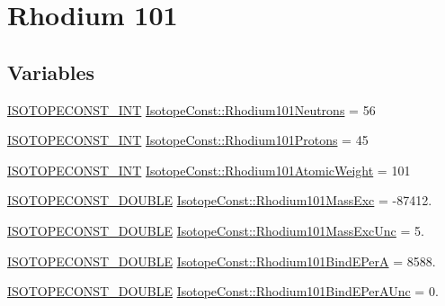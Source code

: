 \hypertarget{group___isotope_const-_rhodium-_rh101}{}\section{Rhodium 101}
\label{group___isotope_const-_rhodium-_rh101}
\subsection*{Variables}
\begin{DoxyCompactItemize}
\item 
\mbox{\hyperlink{group___isotope_const-_macros_ga5f18360b3e99483a35c32d789e62621c}{I\+S\+O\+T\+O\+P\+E\+C\+O\+N\+S\+T\+\_\+\+I\+NT}} \mbox{\hyperlink{group___isotope_const-_rhodium-_rh101_gaf6b99a598c3f915d3813b280d012a056}{Isotope\+Const\+::\+Rhodium101\+Neutrons}} = 56
\item 
\mbox{\hyperlink{group___isotope_const-_macros_ga5f18360b3e99483a35c32d789e62621c}{I\+S\+O\+T\+O\+P\+E\+C\+O\+N\+S\+T\+\_\+\+I\+NT}} \mbox{\hyperlink{group___isotope_const-_rhodium-_rh101_gaef7d93007db50995538de927c6d26046}{Isotope\+Const\+::\+Rhodium101\+Protons}} = 45
\item 
\mbox{\hyperlink{group___isotope_const-_macros_ga5f18360b3e99483a35c32d789e62621c}{I\+S\+O\+T\+O\+P\+E\+C\+O\+N\+S\+T\+\_\+\+I\+NT}} \mbox{\hyperlink{group___isotope_const-_rhodium-_rh101_ga79d913734eb317ce18fe24cd62f9b3a8}{Isotope\+Const\+::\+Rhodium101\+Atomic\+Weight}} = 101
\item 
\mbox{\hyperlink{group___isotope_const-_macros_ga8f45a7272ce02c0b4c65c44636ed719a}{I\+S\+O\+T\+O\+P\+E\+C\+O\+N\+S\+T\+\_\+\+D\+O\+U\+B\+LE}} \mbox{\hyperlink{group___isotope_const-_rhodium-_rh101_ga5cec57b1f6f362ee5c50671dc77ac47d}{Isotope\+Const\+::\+Rhodium101\+Mass\+Exc}} = -\/87412.
\item 
\mbox{\hyperlink{group___isotope_const-_macros_ga8f45a7272ce02c0b4c65c44636ed719a}{I\+S\+O\+T\+O\+P\+E\+C\+O\+N\+S\+T\+\_\+\+D\+O\+U\+B\+LE}} \mbox{\hyperlink{group___isotope_const-_rhodium-_rh101_gabf242d54574ddd723c420ab378fb5e1e}{Isotope\+Const\+::\+Rhodium101\+Mass\+Exc\+Unc}} = 5.
\item 
\mbox{\hyperlink{group___isotope_const-_macros_ga8f45a7272ce02c0b4c65c44636ed719a}{I\+S\+O\+T\+O\+P\+E\+C\+O\+N\+S\+T\+\_\+\+D\+O\+U\+B\+LE}} \mbox{\hyperlink{group___isotope_const-_rhodium-_rh101_ga7b82aaa16ac61b1b1ebdeb05f2ff2b47}{Isotope\+Const\+::\+Rhodium101\+Bind\+E\+PerA}} = 8588.
\item 
\mbox{\hyperlink{group___isotope_const-_macros_ga8f45a7272ce02c0b4c65c44636ed719a}{I\+S\+O\+T\+O\+P\+E\+C\+O\+N\+S\+T\+\_\+\+D\+O\+U\+B\+LE}} \mbox{\hyperlink{group___isotope_const-_rhodium-_rh101_ga61b5544fa549267f47d44358c5d1b055}{Isotope\+Const\+::\+Rhodium101\+Bind\+E\+Per\+A\+Unc}} = 0.

\end{DoxyCompactItemize}
